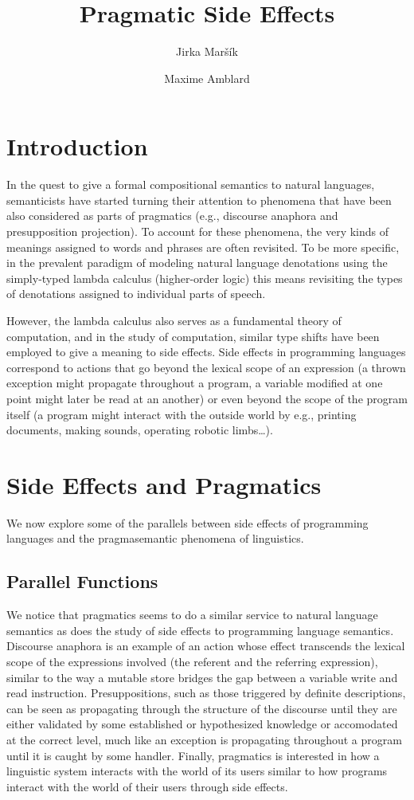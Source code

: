 \documentclass[a4paper,11pt,DIV=12]{scrartcl}
\title{Pragmatic Side Effects}
\author{Jirka Maršík \and Maxime Amblard}
\begin{document}
\maketitle

\section{Introduction}

In the quest to give a formal compositional semantics to natural languages,
semanticists have started turning their attention to phenomena that have
been also considered as parts of pragmatics (e.g., discourse anaphora and
presupposition projection). To account for these phenomena, the very kinds
of meanings assigned to words and phrases are often revisited. To be more
specific, in the prevalent paradigm of modeling natural language
denotations using the simply-typed lambda calculus (higher-order logic)
this means revisiting the types of denotations assigned to individual parts
of speech.

However, the lambda calculus also serves as a fundamental theory of
computation, and in the study of computation, similar type shifts have been
employed to give a meaning to side effects. Side effects in programming
languages correspond to actions that go beyond the lexical scope of an
expression (a thrown exception might propagate throughout a program, a
variable modified at one point might later be read at an another) or even
beyond the scope of the program itself (a program might interact with the
outside world by e.g., printing documents, making sounds, operating robotic
limbs\ldots).

\section{Side Effects and Pragmatics}

We now explore some of the parallels between side effects of programming
languages and the pragmasemantic phenomena of linguistics.

\subsection{Parallel Functions}

We notice that pragmatics seems to do a similar service to natural language
semantics as does the study of side effects to programming language
semantics. Discourse anaphora is an example of an action whose effect
transcends the lexical scope of the expressions involved (the referent and
the referring expression), similar to the way a mutable store bridges the
gap between a variable write and read instruction. Presuppositions, such as
those triggered by definite descriptions, can be seen as propagating
through the structure of the discourse until they are either validated by
some established or hypothesized knowledge or accomodated at the correct
level, much like an exception is propagating throughout a program until it
is caught by some handler. Finally, pragmatics is interested in how a
linguistic system interacts with the world of its users similar to how
programs interact with the world of their users through side effects.
\end{document}
